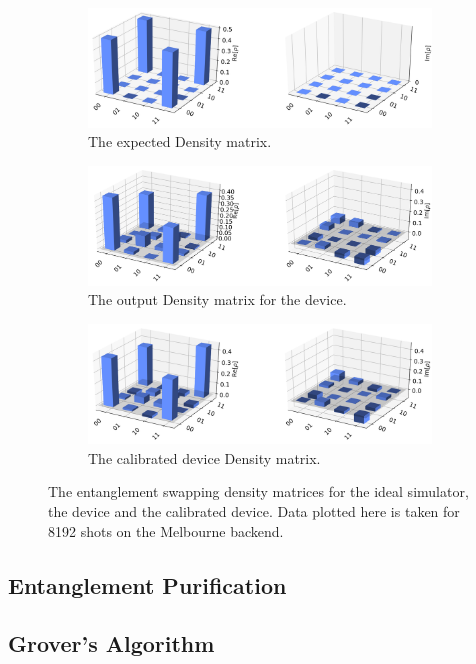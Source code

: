 \begin{figure}
	\begin{subfigure}{.5\textwidth}
    \centering
		\includegraphics[width=.8\linewidth]{images/results/swap_density_sim.png}
		\caption{The expected Density matrix.}
		\label{fig:swap_density_sim}
	\end{subfigure} \newline
	\begin{subfigure}{.5\textwidth}
    \centering
		\includegraphics[width=.8\linewidth]{images/results/swap_density_dev.png}
		\caption{The output Density matrix for the device.}
		\label{fig:swap_density_dev}
	\end{subfigure} \newline
	\begin{subfigure}{.5\textwidth}
    \centering
		\includegraphics[width=.8\linewidth]{images/results/swap_density_cal.png}
		\caption{The calibrated device Density matrix.}
		\label{fig:swap_density_dev}
	\end{subfigure}
	\caption{ The entanglement swapping density matrices for the ideal simulator,
the device and the calibrated device. Data plotted here is taken for 8192 shots
on the Melbourne backend. }
	\label{fig:swap_density}
\end{figure}

\subsection{Entanglement Purification}
\subsection{Grover's Algorithm}


